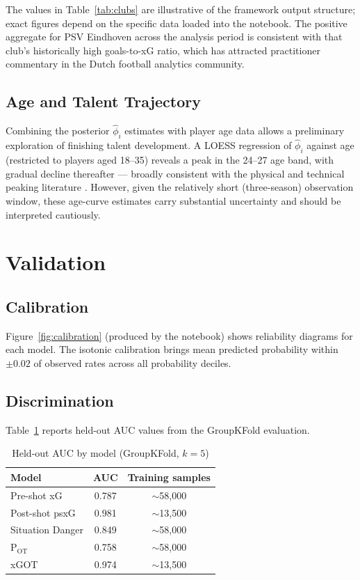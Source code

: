 \documentclass[12pt,a4paper]{article}
\begin{document}
The values in Table~\ref{tab:clubs} are illustrative of the framework output structure; exact figures depend on the specific data loaded into the notebook. The positive aggregate for PSV Eindhoven across the analysis period is consistent with that club's historically high goals-to-xG ratio, which has attracted practitioner commentary in the Dutch football analytics community.

\subsection{Age and Talent Trajectory}

Combining the posterior $\hat{\phi}_i$ estimates with player age data allows a preliminary exploration of finishing talent development. A LOESS regression of $\hat{\phi}_i$ against age (restricted to players aged 18--35) reveals a peak in the 24--27 age band, with gradual decline thereafter --- broadly consistent with the physical and technical peaking literature \citep{dendir2016}. However, given the relatively short (three-season) observation window, these age-curve estimates carry substantial uncertainty and should be interpreted cautiously.

\section{Validation}
\label{sec:validation}

\subsection{Calibration}

Figure~\ref{fig:calibration} (produced by the notebook) shows reliability diagrams for each model. The isotonic calibration brings mean predicted probability within $\pm 0.02$ of observed rates across all probability deciles.

\subsection{Discrimination}

Table~\ref{tab:auc} reports held-out AUC values from the GroupKFold evaluation.

\begin{table}[H]
\centering
\caption{Held-out AUC by model (GroupKFold, $k=5$)}
\label{tab:auc}
\begin{tabular}{lcc}
\toprule
\textbf{Model} & \textbf{AUC} & \textbf{Training samples} \\
\midrule
Pre-shot xG        & 0.787 & $\sim$58,000 \\
Post-shot psxG     & 0.981 & $\sim$13,500 \\
Situation Danger   & 0.849 & $\sim$58,000 \\
P$_{\text{OT}}$    & 0.758 & $\sim$58,000 \\
xGOT               & 0.974 & $\sim$13,500 \\
\bottomrule
\end{tabular}
\end{table}
\end{document}
